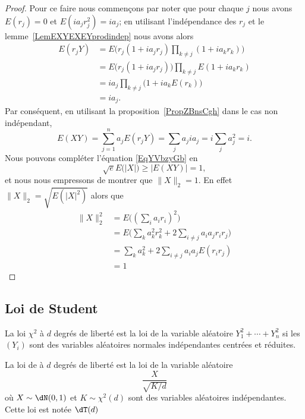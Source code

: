 \begin{proof}
	Pour ce faire nous commençons par noter que pour chaque \( j\) nous avons \( E(r_j)=0\) et \( E(ia_jr_j^2)=ia_j\); en utilisant l'indépendance des \( r_j\) et le lemme~\ref{LemEXYEXEYprodindep} nous avons alors
	\begin{subequations}
		\begin{align}
			E(r_jY) & =E\Big( r_j(1+ia_jr_j)\prod_{k\neq j}(1+ia_kr_k) \Big)  \\
			        & =E\big( r_j(1+ia_jr_j) \big)\prod_{k\neq j}E(1+ia_kr_k) \\
			        & =ia_j\prod_{k\neq j}\big( 1+ia_kE(r_k) \big)            \\
			        & =ia_j.
		\end{align}
	\end{subequations}
	Par conséquent, en utilisant la proposition~\ref{PropZBnsCgh} dans le cas non indépendant,
	\begin{equation}
		E(XY)=\sum_{j=1}^na_jE(r_jY)=\sum_ja_jia_j=i\sum_ja_j^2=i.
	\end{equation}
	Nous pouvons compléter l'équation \eqref{EqYVbzyGb} en
	\begin{equation}
		\sqrt{e}E\big( | X | \big)\geq \big| E(XY) \big|=1,
	\end{equation}
	et nous nous empressons de montrer que \( \| X \|_2=1\). En effet \( \| X \|_2=\sqrt{E(| X |^2)}\) alors que
	\begin{subequations}
		\begin{align}
			\| X \|_2^2 & =E\big( (\sum_ia_ir_i)^2 \big)                             \\
			            & =E\Big( \sum_ka_k^2r_k^2+2\sum_{i\neq j}a_ia_jr_ir_j \Big) \\
			            & =\sum_ka_k^2+2\sum_{i\neq j}a_ia_jE(r_ir_j)                \\
			            & =1
		\end{align}
	\end{subequations}
\end{proof}

\subsection{Loi de Student}

\begin{definition}
	La loi \( \chi^2\) à \( d\) degrés de liberté est la loi de la variable aléatoire \( Y_1^2+\cdots+Y_n^2\) si les \( (Y_i)\) sont des variables aléatoires normales indépendantes centrées et réduites.

	La loi de  à \( d\) degrés de liberté est la loi de la variable aléatoire
	\begin{equation}
		\frac{ X }{ \sqrt{K/d} }
	\end{equation}
	où \( X\sim\dN(0,1)\) et \( K\sim\chi^2(d)\) sont des variables aléatoires indépendantes. Cette loi est notée \( \dT(d)\)
\end{definition}

